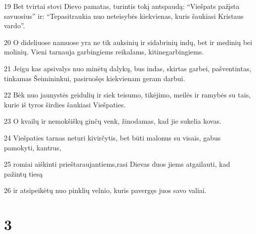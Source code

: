 \par 19 Bet tvirtai stovi Dievo pamatas, turintis tokį antspaudą: “Viešpats pažįsta savuosius” ir: “Tepasitraukia nuo neteisybės kiekvienas, kuris šaukiasi Kristaus vardo”. 
\par 20 O dideliuose namuose yra ne tik auksinių ir sidabrinių indų, bet ir medinių bei molinių. Vieni tarnauja garbingiems reikalams, kiti­negarbingiems. 
\par 21 Jeigu kas apsivalys nuo minėtų dalykų, bus indas, skirtas garbei, pašventintas, tinkamas Šeimininkui, pasiruošęs kiekvienam geram darbui. 
\par 22 Bėk nuo jaunystės geidulių ir siek teisumo, tikėjimo, meilės ir ramybės su tais, kurie iš tyros širdies šaukiasi Viešpaties. 
\par 23 O kvailų ir nemokšiškų ginčų venk, žinodamas, kad jie sukelia kovas. 
\par 24 Viešpaties tarnas neturi kivirčytis, bet būti malonus su visais, gabus pamokyti, kantrus, 
\par 25 romiai aiškinti prieštaraujantiems,­rasi Dievas duos jiems atgailauti, kad pažintų tiesą 
\par 26 ir atsipeikėtų nuo pinklių velnio, kuris pavergęs juos savo valiai.


\chapter{3}


